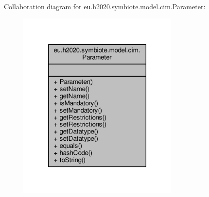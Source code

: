 Collaboration diagram for eu.\+h2020.\+symbiote.\+model.\+cim.\+Parameter\+:
\nopagebreak
\begin{figure}[H]
\begin{center}
\leavevmode
\includegraphics[width=228pt]{classeu_1_1h2020_1_1symbiote_1_1model_1_1cim_1_1Parameter__coll__graph}
\end{center}
\end{figure}
